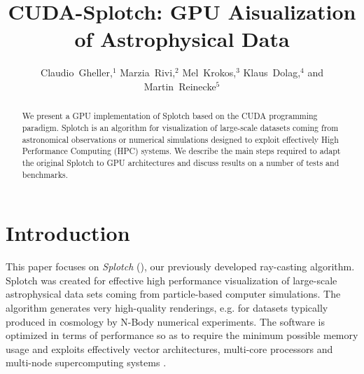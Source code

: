
\resetcounters




\title{CUDA-Splotch: GPU Aisualization of Astrophysical Data}
\author{Claudio~Gheller,$^1$ Marzia~Rivi,$^2$ Mel~Krokos,$^3$ Klaus~Dolag,$^4$ and Martin~Reinecke$^5$
}


\begin{abstract}
We present a GPU implementation of Splotch
 based on the CUDA programming paradigm. Splotch is an algorithm for visualization of large-scale datasets coming from astronomical observations or numerical simulations designed to exploit effectively High Performance Computing (HPC) systems. We describe the main steps required to adapt the original Splotch to GPU architectures and discuss results on a number of tests and benchmarks.

\end{abstract}

\section{Introduction}

This paper focuses on {\it {}Splotch} (\citet{2008NJPh...10l5006D}), our previously developed ray-casting algorithm. Splotch was created for effective high performance visualization of large-scale astrophysical data sets coming from particle-based computer simulations. The algorithm generates very high-quality renderings, e.g. for datasets typically produced in cosmology by N-Body numerical experiments. The software is optimized in terms of performance so as to require the minimum possible memory usage and exploits effectively vector architectures, multi-core processors and multi-node supercomputing systems \citep{jin:high-performance}.

